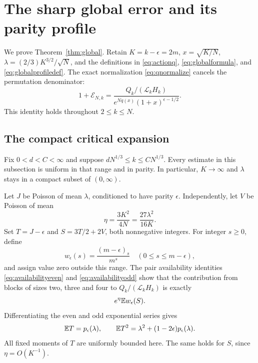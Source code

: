 \section{The sharp global error and its parity profile}\label{sec:globalsharpproof}

We prove Theorem~\ref{thm:global}. Retain $K=k-\epsilon=2m$, $x=\sqrt{K/N}$, $\lambda=(2/3)K^{3/2}/\sqrt N$, and the definitions in \eqref{eq:actionq}, \eqref{eq:globalformula}, and \eqref{eq:globalprofiledef}. The exact normalization \eqref{eq:qnormalize} cancels the permutation denominator:
\begin{equation}\label{eq:globalcancel}
1+\mathcal E_{N,k}
=\frac{Q_k/(\mathcal L_kH_k)}{e^{Nq(x)}(1+x)^{\epsilon-1/2}}.
\end{equation}
This identity holds throughout $2\le k\le N$.

\subsection{The compact critical expansion}

Fix $0<d<C<\infty$ and suppose $dN^{1/3}\le k\le CN^{1/3}$. Every estimate in this subsection is uniform in that range and in parity. In particular, $K\to\infty$ and $\lambda$ stays in a compact subset of $(0,\infty)$.

Let $J$ be Poisson of mean $\lambda$, conditioned to have parity $\epsilon$. Independently, let $V$ be Poisson of mean
\[
\eta=\frac{3K^2}{4N}=\frac{27\lambda^2}{16K}.
\]
Set $T=J-\epsilon$ and $S=3T/2+2V$, both nonnegative integers. For integer $s\ge0$, define
\[
w_\epsilon(s)=\frac{(m-\epsilon)_s}{m^s}
\quad(0\le s\le m-\epsilon),
\]
and assign value zero outside this range. The pair availability identities \eqref{eq:availabilityeven} and \eqref{eq:availabilityodd} show that the contribution from blocks of sizes two, three and four to $Q_k/(\mathcal L_kH_k)$ is exactly
\begin{equation}\label{eq:globalconditioned}
e^\eta\mathbb E w_\epsilon(S).
\end{equation}
Differentiating the even and odd exponential series gives
\begin{equation}\label{eq:globaltriplemoments}
\mathbb E T=p_\epsilon(\lambda),\qquad
\mathbb E T^2=\lambda^2+(1-2\epsilon)p_\epsilon(\lambda).
\end{equation}
All fixed moments of $T$ are uniformly bounded here. The same holds for $S$, since $\eta=O(K^{-1})$.

